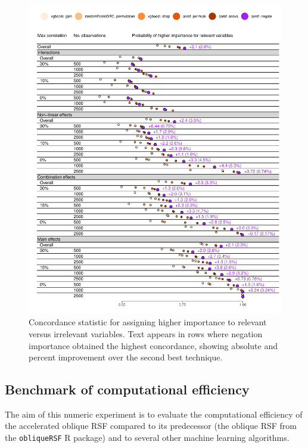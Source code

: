 \documentclass[twoside,11pt]{article}\usepackage[]{graphicx}\usepackage[]{xcolor}
\makeatletter
\def\maxwidth{ %
  \ifdim\Gin@nat@width>\linewidth
    \linewidth
  \else
    \Gin@nat@width
  \fi
}
\newenvironment{knitrout}{}{} %
\makeatother
\begin{document}
\begin{knitrout}
\color{fgcolor}\begin{figure}
\includegraphics[width=\maxwidth]{figure/bm_vi_viz-1} \caption[Concordance statistic for assigning higher importance to relevant versus irrelevant variables]{Concordance statistic for assigning higher importance to relevant versus irrelevant variables. Text appears in rows where negation importance obtained the highest concordance, showing absolute and percent improvement over the second best technique.}\label{fig:bm_vi_viz}
\end{figure}

\end{knitrout}

\subsection{Benchmark of computational efficiency}

The aim of this numeric experiment is to evaluate the computational efficiency of the accelerated oblique RSF compared to its predecessor (the oblique RSF from the \texttt{obliqueRSF} R package) and to several other machine learning algorithms.
\end{document}
